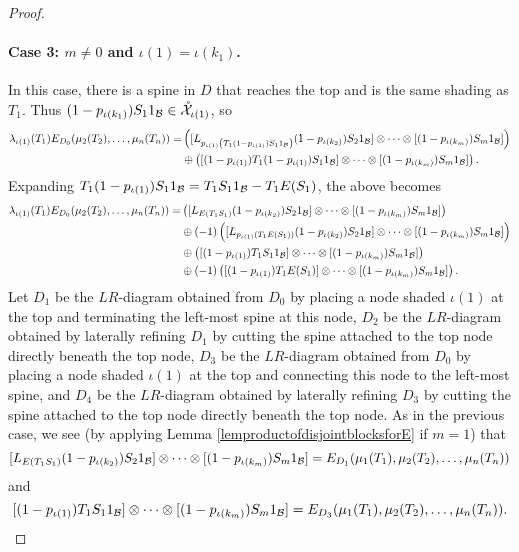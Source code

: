 \begin{proof}
			\paragraph{Case 3: $m \neq 0$ and $\iota(1) = \iota(k_1)$.}
			In this case, there is a spine in $D$ that reaches the top and is the same shading as $T_1$.
			Thus $(1-p_{\iota(k_{1})}) S_1 1_{\mathcal{B}} \in\mathring{\mathcal{X}}_{\iota(1)}$, so
			\begin{align*}
				\lambda_{\iota(1)}(T_1)E_{D_0}(\mu_2(T_2),\ldots, \mu_n(T_n))
				=& \left([L_{p_{\iota(1)}\left(T_1(1-p_{\iota(1)}) S_1 1_{\mathcal{B}}\right)}(1-p_{\iota(k_{2})}) S_2 1_{\mathcal{B}}] \otimes \cdots \otimes [(1-p_{\iota(k_{m})}) S_m1_{\mathcal{B}}]\right) \\
				&
				\oplus \left([(1-p_{\iota(1)})T_1(1-p_{\iota(1)}) S_1 1_{\mathcal{B}}] \otimes \cdots \otimes [(1-p_{\iota(k_{m})}) S_m1_{\mathcal{B}}]\right).
			\end{align*}
			Expanding $T_1(1-p_{\iota(1)}) S_11_{\mathcal{B}} = T_1S_11_{\mathcal{B}} - T_1E(S_1)$, the above becomes
			\begin{align*}
				\lambda_{\iota(1)}(T_1)E_{D_0}(\mu_2(T_2),\ldots, \mu_n(T_n))
				=& \left([L_{E(T_1S_1)}(1-p_{\iota(k_{2})}) S_2 1_{\mathcal{B}}] \otimes \cdots \otimes [(1-p_{\iota(k_{m})}) S_m1_{\mathcal{B}}]\right) \\
				& \oplus (-1) \left([L_{p_{\iota(1)}\left(T_1E(S_1)\right)}(1-p_{\iota(k_{2})}) S_2 1_{\mathcal{B}}] \otimes \cdots \otimes [(1-p_{\iota(k_{m})}) S_m1_{\mathcal{B}}]\right) \\
				&
				\oplus \left([(1-p_{\iota(1)})T_1S_1 1_{\mathcal{B}}] \otimes \cdots \otimes [(1-p_{\iota(k_{m})}) S_m1_{\mathcal{B}}]\right)\\
				&
				\oplus (-1)\left([(1-p_{\iota(1)})T_1E(S_1)] \otimes \cdots \otimes [(1-p_{\iota(k_{m})}) S_m1_{\mathcal{B}}]\right).
			\end{align*}
			Let $D_1$ be the $LR$-diagram obtained from $D_0$ by placing a node shaded $\iota(1)$ at the top and terminating the left-most spine at this node, $D_2$ be the $LR$-diagram obtained by laterally refining $D_1$ by cutting the spine attached to the top node directly beneath the top node, $D_3$ be the $LR$-diagram obtained from $D_0$ by placing a node shaded $\iota(1)$ at the top and connecting this node to the left-most spine, and $D_4$ be the $LR$-diagram obtained by laterally refining $D_3$ by cutting the spine attached to the top node directly beneath the top node.
			As in the previous case, we see (by applying Lemma \ref{lemproductofdisjointblocksforE} if $m = 1$) that
			\[
				[L_{E(T_1S_1)}(1-p_{\iota(k_{2})}) S_2 1_{\mathcal{B}}] \otimes \cdots \otimes [(1-p_{\iota(k_{m})}) S_m1_{\mathcal{B}}] = E_{D_1}(\mu_1(T_1), \mu_2(T_2),\ldots, \mu_n(T_n))
			\]
			and 
			\[
				[(1-p_{\iota(1)})T_1S_1 1_{\mathcal{B}}] \otimes \cdots \otimes [(1-p_{\iota(k_{m})}) S_m1_{\mathcal{B}}] = E_{D_3}(\mu_1(T_1), \mu_2(T_2),\ldots, \mu_n(T_n)).
			\]


\end{proof}
